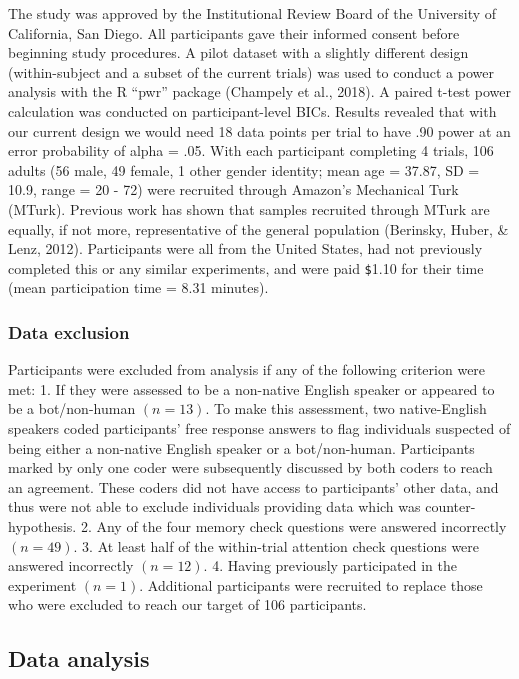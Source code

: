 \documentclass[10pt, letterpaper]{article}
\begin{document}
The study was approved by the Institutional Review Board of the
University of California, San Diego. All participants gave their
informed consent before beginning study procedures. A pilot dataset with
a slightly different design (within-subject and a subset of the current
trials) was used to conduct a power analysis with the R ``pwr'' package
(Champely et al., 2018). A paired t-test power calculation was conducted
on participant-level BICs. Results revealed that with our current design
we would need 18 data points per trial to have .90 power at an error
probability of alpha = .05. With each participant completing 4 trials,
106 adults (56 male, 49 female, 1 other gender identity; mean age =
37.87, SD = 10.9, range = 20 - 72) were recruited through Amazon's
Mechanical Turk (MTurk). Previous work has shown that samples recruited
through MTurk are equally, if not more, representative of the general
population (Berinsky, Huber, \& Lenz, 2012). Participants were all from
the United States, had not previously completed this or any similar
experiments, and were paid \texttt{\$}1.10 for their time (mean
participation time = 8.31 minutes).

\subsubsection{Data exclusion}\label{data-exclusion}

Participants were excluded from analysis if any of the following
criterion were met: 1. If they were assessed to be a non-native English
speaker or appeared to be a bot/non-human \((n = 13)\). To make this
assessment, two native-English speakers coded participants' free
response answers to flag individuals suspected of being either a
non-native English speaker or a bot/non-human. Participants marked by
only one coder were subsequently discussed by both coders to reach an
agreement. These coders did not have access to participants' other data,
and thus were not able to exclude individuals providing data which was
counter-hypothesis. 2. Any of the four memory check questions were
answered incorrectly \((n = 49)\). 3. At least half of the within-trial
attention check questions were answered incorrectly \((n = 12)\). 4.
Having previously participated in the experiment \((n = 1)\). Additional
participants were recruited to replace those who were excluded to reach
our target of 106 participants.

\subsection{Data analysis}\label{data-analysis}
\end{document}
